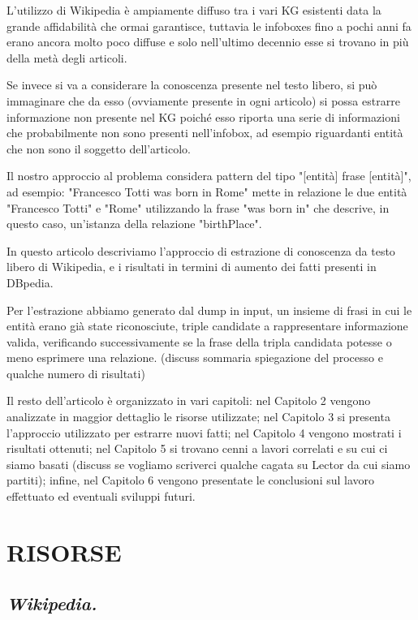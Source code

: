 \documentclass[10pt,a4paper,twocolumn]{article}
\begin{document}
L'utilizzo di Wikipedia è ampiamente diffuso tra i vari KG esistenti data la grande affidabilità che ormai garantisce, tuttavia le infoboxes fino a pochi anni fa erano ancora molto poco diffuse e solo nell'ultimo decennio esse si trovano in più della metà degli articoli.

Se invece si va a considerare la conoscenza presente nel testo libero, si può immaginare che da esso (ovviamente presente in ogni articolo) si possa estrarre informazione non presente nel KG poiché esso riporta una serie di informazioni che probabilmente non sono presenti nell'infobox, ad esempio riguardanti entità che non sono il soggetto dell'articolo.

Il nostro approccio al problema considera pattern del tipo 
"[entità] frase [entità]", ad esempio: "Francesco Totti was born in Rome" mette in relazione le due entità "Francesco Totti" e "Rome" utilizzando la frase "was born in" che descrive, in questo caso, un'istanza della relazione "birthPlace".

In questo articolo descriviamo l'approccio di estrazione di conoscenza da testo libero di Wikipedia, e i risultati in termini di aumento dei fatti presenti in DBpedia.

Per l'estrazione abbiamo generato dal dump in input, un insieme di frasi in cui le entità erano già state riconosciute, triple candidate a rappresentare informazione valida, verificando successivamente se la frase della tripla candidata potesse o meno esprimere una relazione.
(discuss sommaria spiegazione del processo e qualche numero di risultati)

Il resto dell'articolo è organizzato in vari capitoli: nel Capitolo 2 vengono analizzate in maggior dettaglio le risorse utilizzate; nel Capitolo 3 si presenta l'approccio utilizzato per estrarre nuovi fatti; nel Capitolo 4 vengono mostrati i risultati ottenuti; nel Capitolo 5 si trovano cenni a lavori correlati e su cui ci siamo basati (discuss se vogliamo scriverci qualche cagata su Lector da cui siamo partiti); infine, nel Capitolo 6 vengono presentate le conclusioni sul lavoro effettuato ed eventuali sviluppi futuri.

\section{RISORSE}
\subsection*{\textit{Wikipedia.}}
\end{document}
